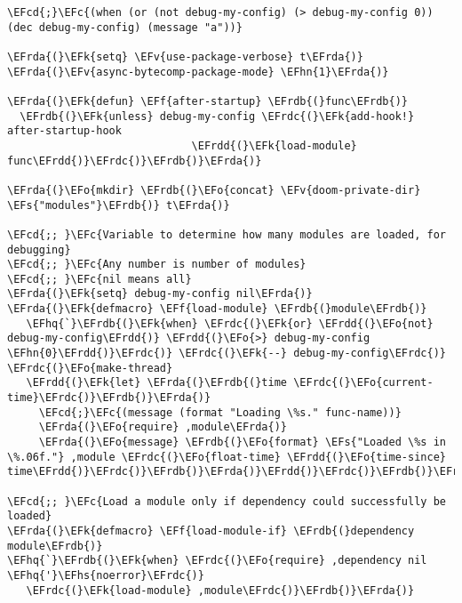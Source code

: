 \documentclass[a4wide,10pt]{article}
\newcommand{\EFc}[1]{\textcolor{EFc}{#1}} %
\newcommand{\EFcd}[1]{\textcolor{EFcd}{#1}} %
\newcommand{\EFs}[1]{\textcolor{EFs}{#1}} %
\newcommand{\EFk}[1]{\textcolor{EFk}{#1}} %
\newcommand{\EFf}[1]{\textcolor{EFf}{#1}} %
\newcommand{\EFv}[1]{\textcolor{EFv}{#1}} %
\newcommand{\EFo}[1]{\textcolor{EFo}{#1}} %
\newcommand{\EFhn}[1]{\textcolor{EFhn}{\textbf{#1}}} %
\newcommand{\EFhq}[1]{\textcolor{EFhq}{#1}} %
\newcommand{\EFhs}[1]{\textcolor{EFhs}{#1}} %
\newcommand{\EFrda}[1]{\textcolor{EFrda}{#1}} %
\newcommand{\EFrdb}[1]{\textcolor{EFrdb}{#1}} %
\newcommand{\EFrdc}[1]{\textcolor{EFrdc}{#1}} %
\newcommand{\EFrdd}[1]{\textcolor{EFrdd}{#1}} %
\begin{document}
\begin{Code}
\begin{Verbatim}
\EFcd{;}\EFc{(when (or (not debug-my-config) (> debug-my-config 0)) (dec debug-my-config) (message "a"))}

\EFrda{(}\EFk{setq} \EFv{use-package-verbose} t\EFrda{)}
\EFrda{(}\EFv{async-bytecomp-package-mode} \EFhn{1}\EFrda{)}

\EFrda{(}\EFk{defun} \EFf{after-startup} \EFrdb{(}func\EFrdb{)}
  \EFrdb{(}\EFk{unless} debug-my-config \EFrdc{(}\EFk{add-hook!} after-startup-hook
                             \EFrdd{(}\EFk{load-module} func\EFrdd{)}\EFrdc{)}\EFrdb{)}\EFrda{)}

\EFrda{(}\EFo{mkdir} \EFrdb{(}\EFo{concat} \EFv{doom-private-dir} \EFs{"modules"}\EFrdb{)} t\EFrda{)}

\EFcd{;; }\EFc{Variable to determine how many modules are loaded, for debugging}
\EFcd{;; }\EFc{Any number is number of modules}
\EFcd{;; }\EFc{nil means all}
\EFrda{(}\EFk{setq} debug-my-config nil\EFrda{)}
\EFrda{(}\EFk{defmacro} \EFf{load-module} \EFrdb{(}module\EFrdb{)}
   \EFhq{`}\EFrdb{(}\EFk{when} \EFrdc{(}\EFk{or} \EFrdd{(}\EFo{not} debug-my-config\EFrdd{)} \EFrdd{(}\EFo{>} debug-my-config \EFhn{0}\EFrdd{)}\EFrdc{)} \EFrdc{(}\EFk{--} debug-my-config\EFrdc{)} \EFrdc{(}\EFo{make-thread}
   \EFrdd{(}\EFk{let} \EFrda{(}\EFrdb{(}time \EFrdc{(}\EFo{current-time}\EFrdc{)}\EFrdb{)}\EFrda{)}
     \EFcd{;}\EFc{(message (format "Loading \%s." func-name))}
     \EFrda{(}\EFo{require} ,module\EFrda{)}
     \EFrda{(}\EFo{message} \EFrdb{(}\EFo{format} \EFs{"Loaded \%s in \%.06f."} ,module \EFrdc{(}\EFo{float-time} \EFrdd{(}\EFo{time-since} time\EFrdd{)}\EFrdc{)}\EFrdb{)}\EFrda{)}\EFrdd{)}\EFrdc{)}\EFrdb{)}\EFrda{)}

\EFcd{;; }\EFc{Load a module only if dependency could successfully be loaded}
\EFrda{(}\EFk{defmacro} \EFf{load-module-if} \EFrdb{(}dependency module\EFrdb{)}
\EFhq{`}\EFrdb{(}\EFk{when} \EFrdc{(}\EFo{require} ,dependency nil \EFhq{'}\EFhs{noerror}\EFrdc{)}
   \EFrdc{(}\EFk{load-module} ,module\EFrdc{)}\EFrdb{)}\EFrda{)}


\end{Verbatim}
\end{Code}
\end{document}
